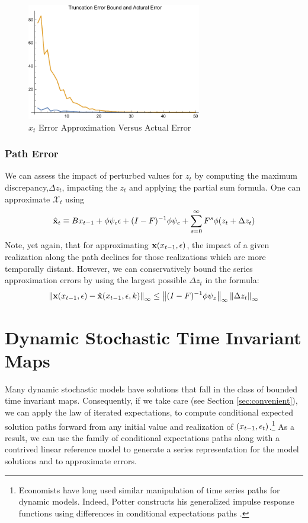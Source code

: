 \documentclass[12pt]{article}
\begin{document}
\begin{figure}
  \centering


\includegraphics[width=3in]{arbTruncErr.pdf}  
  \caption{$x_t$ Error Approximation Versus Actual Error} \label{figArbTrunc}

\end{figure}

\subsubsection{Path Error}


We can assess the impact of perturbed values for $z_t$ by computing the maximum discrepancy,$\Delta z_t$, impacting the $z_t$ and applying the 
partial sum formula.
One can  approximate $\mathcal{X}_t$ using
 	 \begin{gather}
 	 \hat{\mathbf{x}}_t \equiv B x_{t-1}+ \phi \psi_\epsilon\epsilon  + (I - F)^{-1} \phi \psi_c + \sum_{s=0}^\infty F^s \phi (z_{t}+\Delta z_{t})\label{theDeltaSeries}
 \end{gather}
Note, yet again, that for approximating $\mathbf{x}(x_{t-1},\epsilon)$, the impact of  a given realization along the path declines for those realizations which are  more temporally distant.
However, we can conservatively bound the  series approximation  errors by using the largest possible $\Delta z_t$ in the formula:
    \begin{gather}
\left\lVert\mathbf{x}(x_{t-1},\epsilon)-\hat{\mathbf{x}}(x_{t-1},\epsilon,k)\right\rVert_\infty \le \left\lVert(I -F)^{-1} \phi \psi_z\right\rVert_\infty  \left\lVert\Delta z_t \right\rVert_\infty \label{pathErr}
    \end{gather}


\label{sec:pathnorm}

\clearpage
\section{Dynamic Stochastic Time Invariant Maps}
\label{sec:extToMaps}

Many dynamic stochastic models have solutions that 
fall in the class of bounded time invariant maps.
Consequently, if we take care (see Section \ref{sec:convenient}), we can apply the law of iterated expectations, 
to compute conditional expected solution paths 
forward from any initial value and realization of $(x_{t-1},\epsilon_t)$.\footnote{Economists have long used similar manipulation of
time series paths for dynamic models. 
Indeed, Potter constructs his generalized impulse response functions using
differences in conditional expectations paths \citep{Potter2000,Koop1996a}.
}
As a result, we can use the family of conditional expectations paths 
along with a contrived linear reference model to generate
a series representation for the model solutions  and
to approximate errors.
\end{document}
